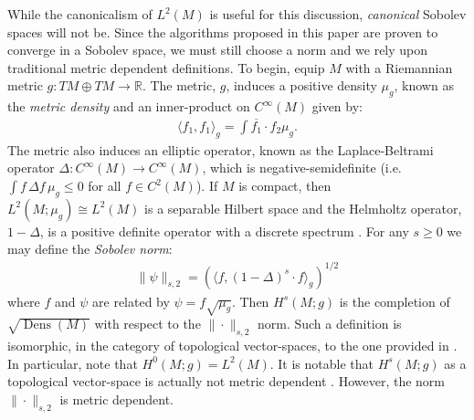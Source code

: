 \documentclass[final,leqno]{siamltex1213}
\DeclareMathOperator{\Dens}{Dens}
\begin{document}
While the canonicalism of $L^{2}(M)$ is useful for this discussion, \emph{canonical} Sobolev spaces will not be.
Since the algorithms proposed in this paper are proven to converge in a Sobolev space, we must still choose a norm and we rely upon traditional metric dependent definitions.  
To begin, equip $M$ with a Riemannian metric $g:TM \oplus TM \to \mathbb{R}$.
The metric, $g$, induces a positive density $\mu_g$, known as the \emph{metric density} and an inner-product on $C^\infty(M)$
given by:
\begin{align}
	\langle f_1 , f_1 \rangle_{g} = \int \overline{f_1} \cdot f_2 \mu_g.
\end{align}
The metric also induces an elliptic operator, known as the Laplace-Beltrami operator $\Delta: C^{\infty}(M) \to C^{\infty}(M)$, which is negative-semidefinite (i.e. $\int f \, \Delta f \, \mu_{g} \leq 0$ for all $f \in C^{2}(M)$).
If $M$ is compact, then $L^2(M ; \mu_g) \cong L^2(M)$ is a separable Hilbert space and the Helmholtz operator, $1 - \Delta$, is a positive definite operator
with a discrete spectrum \cite{Taylor1974}.
For any $s \geq 0$ we may define the \emph{Sobolev norm}:
\begin{align}
	\| \psi \|_{s,2} =  \left( \langle f , (1-\Delta)^s \cdot  f \rangle_{g} \right)^{1/2}
\end{align}
where $f$ and $\psi$ are related by $\psi = f \sqrt{\mu_{g}}$.
Then $H^s(M ;g)$ is the completion of $\sqrt{\Dens(M)}$ with respect to the $\| \cdot \|_{s,2}$ norm.  Such a definition is isomorphic, in the category of topological vector-spaces, to the one provided in \cite{Hebey1999}.
In particular, note that $H^0(M;g) = L^2(M)$.  It is notable that $H^{s}(M;g)$ as a topological vector-space is actually not metric dependent \cite[Proposition 2.2]{Hebey1999}.
However, the norm $\| \cdot \|_{s,2}$ is metric dependent.
\end{document}
